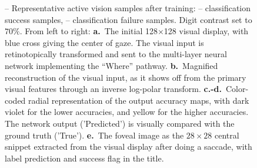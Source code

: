 \begin{figure}[t!]
	\caption{
		{\A-- \E Representative active vision samples after training}: \A-- \B  classification success samples, \C-- \E classification failure samples. Digit contrast set to $70\%$.  From left to right: {\bf a.}~The initial 128$\times$128 visual display, with blue cross giving the center of gaze.
		The visual input is retinotopically transformed and sent to the multi-layer neural network implementing the ``Where'' pathway.
		{\bf b.}~Magnified reconstruction of the  visual input, as it shows off from the primary visual features through an inverse log-polar transform.
		{\bf c.-d.}~Color-coded radial representation of the output accuracy maps, with dark violet for the lower accuracies, and yellow for the higher accuracies. The network output ('Predicted') is visually compared with the ground truth ('True'). %
		{\bf e.}~The foveal image as the $28 \times 28$ central snippet extracted from the visual display after doing a saccade, with label prediction and success flag in the title.
		\label{fig:saccades}}%
\end{figure}%

